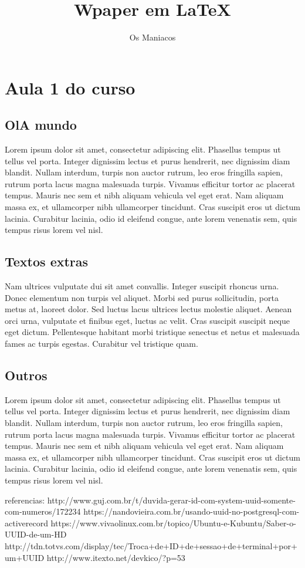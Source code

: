 \documentclass[12pt]{article}
\title{Wpaper em \LaTeX}
\author{Os \Tex{}Maniacos}
\begin{document}
\maketitle
\section{Aula 1 do curso}
\subsection{OlA mundo}
Lorem ipsum dolor sit amet, consectetur adipiscing elit. 
Phasellus tempus ut tellus vel porta. Integer dignissim lectus et purus hendrerit, 
nec dignissim diam blandit. Nullam interdum, turpis non auctor rutrum, leo eros fringilla sapien, 
rutrum porta lacus magna malesuada turpis. Vivamus efficitur tortor ac placerat tempus. 
Mauris nec sem et nibh aliquam vehicula vel eget erat. Nam aliquam massa ex, et ullamcorper nibh ullamcorper tincidunt. 
Cras suscipit eros ut dictum lacinia. Curabitur lacinia, odio id eleifend congue, 
ante lorem venenatis sem, quis tempus risus lorem vel nisl. 

\subsection{Textos extras}
Nam ultrices vulputate dui sit amet convallis. Integer suscipit rhoncus urna. 
Donec elementum non turpis vel aliquet. Morbi sed purus sollicitudin, porta metus at, 
laoreet dolor. Sed luctus lacus ultrices lectus molestie aliquet. Aenean orci urna, 
vulputate et finibus eget, luctus ac velit. Cras suscipit suscipit neque eget dictum. 
Pellentesque habitant morbi tristique senectus et netus et malesuada fames ac turpis egestas. 
Curabitur vel tristique quam. 

\subsection{Outros}
Lorem ipsum dolor sit amet, consectetur adipiscing elit. 
Phasellus tempus ut tellus vel porta. Integer dignissim lectus et purus hendrerit, 
nec dignissim diam blandit. Nullam interdum, turpis non auctor rutrum, leo eros fringilla sapien, 
rutrum porta lacus magna malesuada turpis. Vivamus efficitur tortor ac placerat tempus. 
Mauris nec sem et nibh aliquam vehicula vel eget erat. Nam aliquam massa ex, et ullamcorper nibh ullamcorper tincidunt. 
Cras suscipit eros ut dictum lacinia. Curabitur lacinia, odio id eleifend congue, 
ante lorem venenatis sem, quis tempus risus lorem vel nisl. 

referencias:
http://www.guj.com.br/t/duvida-gerar-id-com-system-uuid-somente-com-numeros/172234
https://nandovieira.com.br/usando-uuid-no-postgresql-com-activerecord
https://www.vivaolinux.com.br/topico/Ubuntu-e-Kubuntu/Saber-o-UUID-de-um-HD
http://tdn.totvs.com/display/tec/Troca+de+ID+de+sessao+de+terminal+por+um+UUID
http://www.itexto.net/devkico/?p=53

\end{document}
